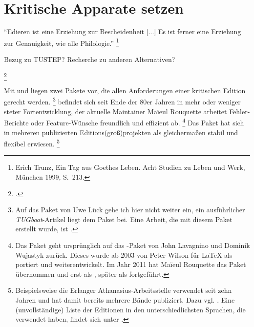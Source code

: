 \chapter{Kritische Apparate setzen}

 
\label{reledmac}

\enquote{Edieren ist eine Erziehung zur Bescheidenheit [...] Es ist ferner eine Erziehung zur 
Genauigkeit, wie alle Philologie.}%
\footnote{Erich Trunz, Ein Tag aus Goethes Leben. Acht Studien zu Leben und Werk, München 1999, S.~213.}

Bezug zu TUSTEP?
Recherche zu anderen Alternativen?

\footcite[165\psqq]{rouquette:2012}

\cite{stockhausen:mde2016/2}

Mit  und  liegen zwei Pakete vor, die allen Anforderungen einer kritischen Edition gerecht werden.%
\footnote{%
	Auf das Paket  von Uwe Lück gehe ich hier nicht weiter ein, ein ausführlicher \textsl{TUGboat}-Artikel liegt dem Paket bei. Eine Arbeit, die mit diesem Paket erstellt wurde, ist \cite{mariev:joh_ant}.}
 befindet sich seit Ende der 80er Jahren in mehr oder weniger steter Fortentwicklung, der aktuelle Maintainer Maïeul Rouquette arbeitet Fehler-Berichte oder Feature-Wünsche freundlich und effizient ab.%
\footnote{%
	Das Paket  geht ursprünglich auf das -Paket  von John Lavagnino und Dominik Wujastyk zurück. Dieses wurde ab 2003 von Peter Wilson für \LaTeX{} als  portiert und weiterentwickelt. Im Jahr 2011 hat Maïeul Rouquette das Paket übernommen und erst als , später als  fortgeführt.}
Das Paket hat sich in mehreren publizierten Editions(groß)projekten als gleichermaßen stabil und flexibel erwiesen.%
\footnote{%
	Beispielsweise die Erlanger Athanasius-Arbeitsstelle verwendet seit zehn Jahren  und hat damit bereits mehrere Bände publiziert. Dazu vgl. \cite{stockhausen:mde2016/2}. Eine (unvollständige) Liste der Editionen in den unterschiedlichsten Sprachen, die  verwendet haben, findet sich unter \cite{url:reledmac-benutzung}.}
